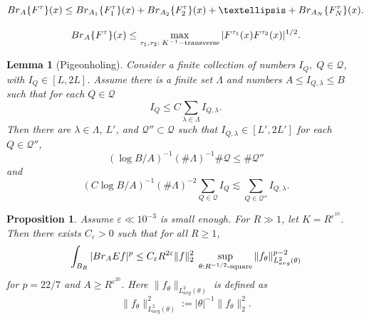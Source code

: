 \documentclass[10pt,a4paper]{amsart}
\newtheorem{lemma}{Lemma}
\newtheorem{proposition}{Proposition}
\newcommand{\Br}{{\rm{Br}}}
\newcommand{\e}{\varepsilon}
\begin{document}
	\begin{equation}
		\label{broad-triangle}
		\Br_A \{F^\tau\}(x)\leq \Br_{A_1} \{F^{\tau}_1\}(x)+\Br_{A_2}\{F^{\tau}_2\}(x)+\ldots+\Br_{A_N}\{F^{\tau}_N\}(x).
	\end{equation}

	\begin{equation}
		\label{broad-bilinear}
		\Br_A \{F^{\tau}\}(x)\leq \max_{\tau_1,\tau_2:\;K^{-1}-\text{transverse}}|F^{\tau_1}(x)F^{\tau_2}(x)|^{1/2}.
	\end{equation}

\begin{lemma}[Pigeonholing]
\label{lcomb}Consider a finite collection of numbers $I_Q,\;Q\in\mathcal Q$, with $I_Q\in [L,2L]$. Assume there is a finite set $\Lambda$ and numbers $A\le I_{Q,\lambda}\le B$ such that for each $Q\in\mathcal Q$
$$I_Q\le C\sum_{\lambda\in\Lambda}I_{Q,\lambda}.$$
Then there are $\lambda\in\Lambda$, $L'$, and $\mathcal Q''\subset \mathcal Q$ such that $I_{Q,\lambda}\in [L',2L']$ for each $Q\in\mathcal Q''$,
$$ (\log B/A)^{-1}(\#\Lambda)^{-1}\#\mathcal Q\le\#\mathcal Q'' $$ and
$$(C\log B/A)^{-1}(\#\Lambda)^{-2}\sum_{Q\in \mathcal Q}I_Q\lesssim \sum_{Q\in\mathcal Q''}I_{Q,\lambda}.$$
\end{lemma}

\begin{proposition}
	\label{broad-prop}
	Assume $\e\ll 10^{-3}$ is small enough.
	For $R\gg 1$, let $K=R^{\e^{10}}$.
	Then there exists $C_\e>0$ such that for all $R\geq1$,
	\begin{equation}
		\label{mixed-norm}
		\int_{B_R}|\Br_{A} Ef|^p\leq C_\e R^{2\e}\|f\|_2^2\;\sup_{\theta:R^{-1/2}\text{-square}}\|f_\theta\|_{L^2_{avg}(\theta)}^{p-2}
	\end{equation}
	for $p=22/7$ and $A\geq R^{\e^{20}}$.
	Here $\|f_\theta\|_{L^2_{avg}(\theta)}$ is defined as
	\begin{equation}
		\|f_\theta\|_{L^2_{avg}(\theta)}^2:=|\theta|^{-1}\|f_\theta\|_2^2.
	\end{equation}
\end{proposition}
\end{document}
